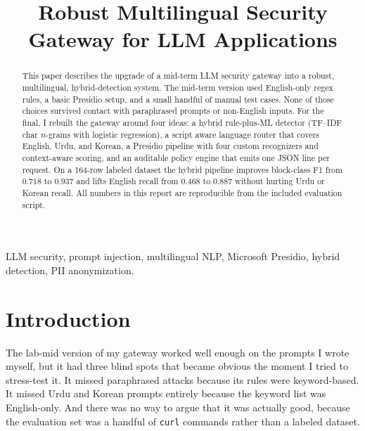 \documentclass[conference]{IEEEtran}
\begin{document}
\title{Robust Multilingual Security Gateway for LLM Applications}

\author{
}

\maketitle

\begin{abstract}
This paper describes the upgrade of a mid-term LLM security gateway
into a robust, multilingual, hybrid-detection system. The mid-term
version used English-only regex rules, a basic Presidio setup, and a
small handful of manual test cases. None of those choices survived
contact with paraphrased prompts or non-English inputs. For the final,
I rebuilt the gateway around four ideas: a hybrid rule-plus-ML
detector (TF--IDF char $n$-grams with logistic regression), a script
aware language router that covers English, Urdu, and Korean, a Presidio
pipeline with four custom recognizers and context-aware scoring, and an
auditable policy engine that emits one JSON line per request. On a
164-row labeled dataset the hybrid pipeline improves block-class F1 from
$0.718$ to $0.937$ and lifts English recall from $0.468$ to $0.887$
without hurting Urdu or Korean recall. All numbers in this report are
reproducible from the included evaluation script.
\end{abstract}

\begin{IEEEkeywords}
LLM security, prompt injection, multilingual NLP, Microsoft Presidio,
hybrid detection, PII anonymization.
\end{IEEEkeywords}

\section{Introduction}
The lab-mid version of my gateway worked well enough on the prompts I
wrote myself, but it had three blind spots that became obvious the
moment I tried to stress-test it. It missed paraphrased attacks because
its rules were keyword-based. It missed Urdu and Korean prompts entirely
because the keyword list was English-only. And there was no way to argue
that it was actually good, because the evaluation set was a handful of
\texttt{curl} commands rather than a labeled dataset.
\end{document}
